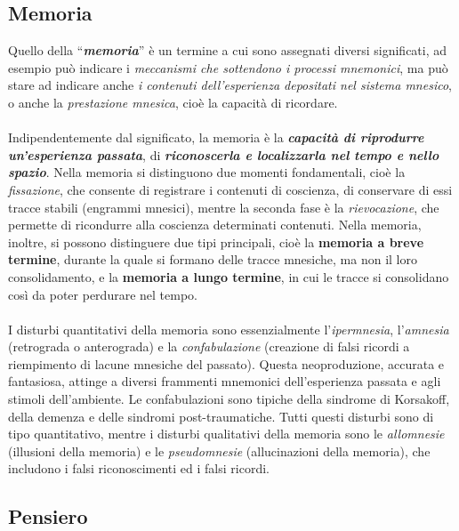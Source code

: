 \subsection{Memoria}

Quello della ``\textbf{\emph{memoria}}'' è un termine a cui sono
assegnati diversi significati, ad esempio può indicare i
\emph{meccanismi che sottendono i processi mnemonici}, ma può stare ad
indicare anche \emph{i contenuti dell'esperienza depositati nel sistema
mnesico}, o anche la \emph{prestazione mnesica}, cioè la capacità di
ricordare.
\\\\
Indipendentemente dal significato, la memoria è la
\textbf{\emph{capacità di riprodurre un'esperienza passata}}, di
\textbf{\emph{riconoscerla e localizzarla nel tempo e nello spazio}}.
Nella memoria si distinguono due momenti fondamentali, cioè la
\emph{fissazione}, che consente di registrare i contenuti di coscienza,
di conservare di essi tracce stabili (engrammi mnesici), mentre la
seconda fase è la \emph{rievocazione}, che permette di ricondurre alla
coscienza determinati contenuti. Nella memoria, inoltre, si possono
distinguere due tipi principali, cioè la \textbf{memoria a breve
termine}, durante la quale si formano delle tracce mnesiche, ma non il
loro consolidamento, e la \textbf{memoria a lungo termine}, in cui le
tracce si consolidano così da poter perdurare nel tempo.
\\\\
I disturbi quantitativi della memoria sono essenzialmente
l'\emph{ipermnesia}, l'\emph{amnesia} (retrograda o anterograda) e la
\emph{confabulazione} (creazione di falsi ricordi a riempimento di
lacune mnesiche del passato). Questa neoproduzione, accurata e
fantasiosa, attinge a diversi frammenti mnemonici dell'esperienza
passata e agli stimoli dell'ambiente. Le confabulazioni sono tipiche
della sindrome di Korsakoff, della demenza e delle sindromi
post-traumatiche. Tutti questi disturbi sono di tipo quantitativo,
mentre i disturbi qualitativi della memoria sono le \emph{allomnesie}
(illusioni della memoria) e le \emph{pseudomnesie} (allucinazioni della
memoria), che includono i falsi riconoscimenti ed i falsi ricordi.

\subsection{Pensiero}

